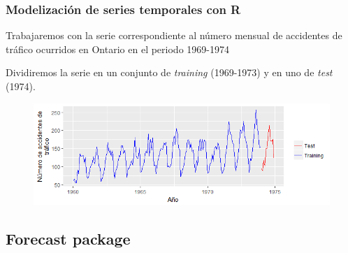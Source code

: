 \documentclass[10pt,a4paper,twoside]{beamer}
\begin{document}
\begin{frame}
\frametitle{Modelización de series temporales con R}

\begin{itemize*}
\item Trabajaremos con la serie correspondiente al número mensual de accidentes de tráfico ocurridos en Ontario en el periodo 1969-1974
\item Dividiremos la serie en un conjunto de \textit{training} (1969-1973) y en uno de \textit{test} (1974).
\end{itemize*}

\begin{figure}
    \centering
    \centerline{\includegraphics[scale = 0.6]{Images/31.png}}
    \label{accidentes}
\end{figure}

\end{frame}


\subsection{Forecast package}

\end{document}
